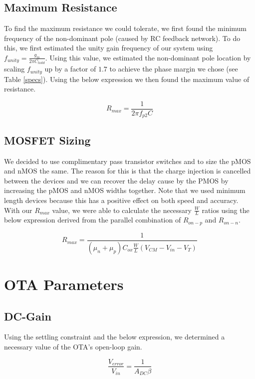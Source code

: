 \documentclass{article}
\begin{document}
\subsection{Maximum Resistance}
To find the maximum resistance we could tolerate, we first found the minimum frequency of the non-dominant pole (caused by RC feedback network). To do this, we first estimated the unity gain frequency of our system using $f_{unity} = \frac{g_m}{2\pi C_{hold}}$. Using this value, we estimated the non-dominant pole location by scaling $f_{unity}$ up by a factor of $1.7$ to achieve the phase margin we chose (see Table \ref{specs}). Using the below expression we then found the maximum value of resistance.

\begin{equation}
R_{max} = \frac{1}{2 \pi f_{p2}C}
\end{equation}

\subsection{MOSFET Sizing}
We decided to use complimentary pass transistor switches and to size the pMOS and nMOS the same. The reason for this is that the charge injection is cancelled between the devices and we can recover the delay cause by the PMOS by increasing the pMOS and nMOS widths together. Note that we used minimum length devices because this has a positive effect on both speed and accuracy. With our $R_{max}$ value, we were able to calculate the necessary $\frac{W}{L}$ ratios using the below expression derived from the parallel combination of $R_{on-p}$ and $R_{on-n}$.

\begin{equation}
R_{max} = \frac{1}{(\mu_n + \mu_p) C_{ox} \frac{W}{L} (V_{CM} - V_{in} - V_T)}
\end{equation}

\section{OTA Parameters}
\subsection{DC-Gain}
Using the settling constraint and the below expression, we determined a necessary value of the OTA's open-loop gain.

\begin{equation}
\frac{V_{error}}{V_{in}} = \frac{1}{A_{DC}\beta}
\end{equation}
\end{document}
